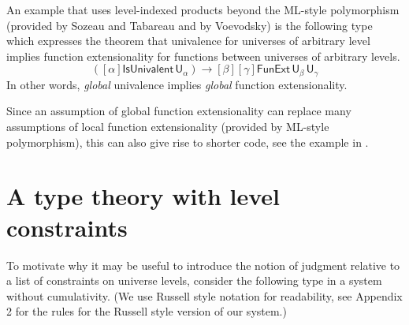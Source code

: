 \documentclass[11pt,a4paper]{article}
\theoremstyle{definition}
\newcommand{\NN}{\mathsf{N}}
\newcommand{\UU}{\mathsf{U}}
\begin{document}
An example that uses level-indexed products beyond the ML-style
polymorphism (provided by Sozeau and Tabareau and by Voevodsky)
is the following type which
expresses the theorem that univalence for universes of arbitrary level implies
function extensionality for functions between universes of arbitrary levels.
$$
([\alpha]\mathsf{IsUnivalent}\, \UU_\alpha)
\to [\beta][\gamma] \mathsf{FunExt}\, \UU_\beta\, \UU_\gamma
$$
In other words, {\em global} univalence implies {\em global} function 
extensionality.

Since an assumption of global function extensionality can replace many assumptions of local function extensionality (provided by ML-style polymorphism), this can also give rise to shorter code, see the example in \cite[Section 3.25]{hott:uf:in:agda}.





\section{A type theory with level constraints}\label{sec:constraints}

To motivate why it may be useful to introduce the notion of judgment relative to a list of constraints on universe levels, consider the following type in a system without cumulativity. (We use Russell style notation for readability, see Appendix 2 for the rules for the Russell style version of our system.)
\end{document}

